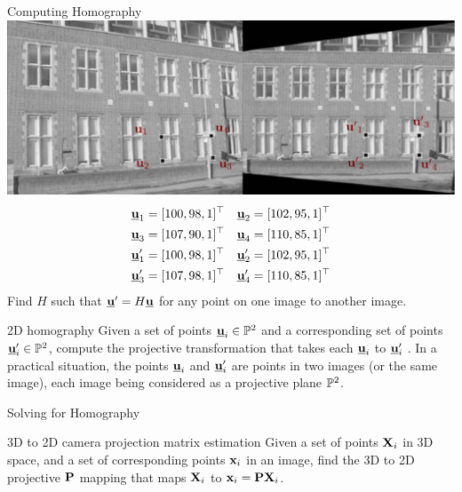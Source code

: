 \documentclass[times,t]{beamer}
\begin{document}
\begin{frame}{Computing Homography}
  \includegraphics[width=\linewidth]{media/removing-perspective-distortion.png.pdf}
  \begin{align*}
    \underline{\mathbf{u}}_1 &= [100, 98, 1]^\top&
    \underline{\mathbf{u}}_2 &= [102, 95, 1]^\top\\
    \underline{\mathbf{u}}_3 &= [107, 90, 1]^\top&
    \underline{\mathbf{u}}_4 &= [110, 85, 1]^\top \\
    \underline{\mathbf{u}}'_1 &= [100, 98, 1]^\top&
    \underline{\mathbf{u}}'_2 &= [102, 95, 1]^\top\\
    \underline{\mathbf{u}}'_3 &= [107, 98, 1]^\top&
    \underline{\mathbf{u}}'_4 &= [110, 85, 1]^\top
  \end{align*}
  Find $H$ such that $\underline{\mathbf{u}}' = H\underline{\mathbf{u}}$ for any point on one image to another image.
\end{frame}

\begin{frame}{2D homography}
  Given a set of points $\underline{\mathbf{u}}_i \in \mathbb{P}^2$ and a corresponding set of
  points $\underline{\mathbf{u}}'_i \in \mathbb{P}^2$, compute the projective transformation that takes each
  $\underline{\mathbf{u}}_i$ to $\underline{\mathbf{u}}'_i$ . In a practical situation, the points $\underline{\mathbf{u}}_i$ and   $\underline{\mathbf{u}}'_i$  are points in two images
  (or the same image), each image being considered as a projective plane  $\mathbb{P}^2$.
\end{frame}

\begin{frame}{Solving for Homography }
\end{frame}


\begin{frame}{3D  to  2D camera projection matrix estimation}
  Given a set of points $\mathbf{X}_i$ in 3D space, and a set
  of corresponding points $\mathbf{x}_i$ in an image, find the 3D to 2D projective
  $\mathbf{P}$ mapping
  that maps $\mathbf{X}_i$ to $\mathbf{x}_i  =  \mathbf{P}\mathbf{X}_i$.
\end{frame}
\end{document}
